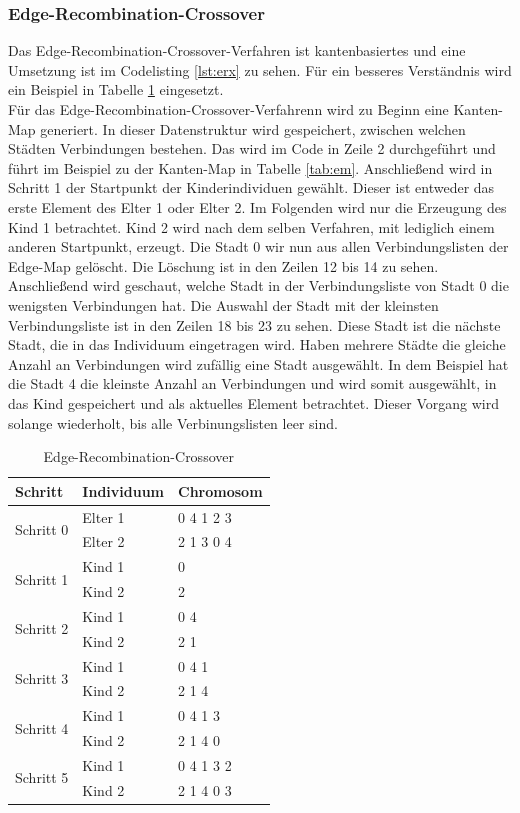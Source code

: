 \subsubsection{Edge-Recombination-Crossover}
Das Edge-Recombination-Crossover-Verfahren ist kantenbasiertes und eine Umsetzung ist im Codelisting \ref{lst:erx} zu sehen. Für ein besseres Verständnis wird ein Beispiel in Tabelle \ref{tab:erx2} eingesetzt.\\
Für das Edge-Recombination-Crossover-Verfahrenn wird zu Beginn eine Kanten-Map generiert. In dieser Datenstruktur wird gespeichert, zwischen welchen Städten Verbindungen bestehen. Das wird im Code in Zeile 2 durchgeführt und führt im Beispiel zu der Kanten-Map in Tabelle \ref{tab:em}.
Anschließend wird in Schritt 1 der Startpunkt der Kinderindividuen gewählt. Dieser ist entweder das erste Element des Elter 1 oder Elter 2. Im Folgenden wird nur die Erzeugung des Kind 1 betrachtet. Kind 2 wird nach dem selben Verfahren, mit lediglich einem anderen Startpunkt, erzeugt.
Die Stadt 0 wir nun aus allen Verbindungslisten der Edge-Map gelöscht. Die Löschung ist in den Zeilen 12 bis 14 zu sehen. Anschließend wird geschaut, welche Stadt in der Verbindungsliste von Stadt 0 die wenigsten Verbindungen hat. Die Auswahl der Stadt mit der kleinsten Verbindungsliste ist in den Zeilen 18 bis 23 zu sehen. Diese Stadt ist die nächste Stadt, die in das Individuum eingetragen wird. Haben mehrere Städte die gleiche Anzahl an Verbindungen wird zufällig eine Stadt ausgewählt. In dem Beispiel hat die Stadt 4 die kleinste Anzahl an Verbindungen und wird somit ausgewählt, in das Kind gespeichert und als aktuelles Element betrachtet. Dieser Vorgang wird solange wiederholt, bis alle Verbinungslisten leer sind.

\begin{table}[H]
\caption{Edge-Recombination-Crossover}
\begin{tabularx}{\textwidth}{l|l|l}
Schritt & Individuum & Chromosom\\
\hline
\multirow{2}{*}{Schritt 0}
		& Elter 1 & 0 4 1 2 3\\
		& Elter 2 & 2 1 3 0 4\\
\hline
\multirow{2}{*}{Schritt 1}
		& Kind 1 & 0\\
		& Kind 2 & 2\\
\hline
\multirow{2}{*}{Schritt 2}
		& Kind 1 & 0 4 \\
		& Kind 2 & 2 1 \\
\hline
\multirow{2}{*}{Schritt 3}
		& Kind 1 & 0 4 1\\
		& Kind 2 & 2 1 4\\
\hline
\multirow{2}{*}{Schritt 4}
		& Kind 1 & 0 4 1 3\\
		& Kind 2 & 2 1 4 0\\
\hline
\multirow{2}{*}{Schritt 5}
		& Kind 1 & 0 4 1 3 2\\
		& Kind 2 & 2 1 4 0 3\\
\end{tabularx}
\label{tab:erx2}
\end{table}

